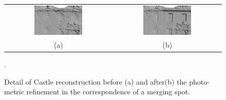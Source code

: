 \begin{figure}[tpb]
\centering
\begin{tabular}{cc}
\includegraphics[width=0.47\textwidth]{./img/ch-incr-dens/castle09}&
\includegraphics[width=0.47\textwidth]{./img/ch-incr-dens/castle10}\\
(a)&(b)
\end{tabular}
\caption{Detail of Castle reconstruction before (a) and after(b) the photo-metric refinement in the correspondence of a merging spot.}.
\label{fig:detailcastle2}
\end{figure}




